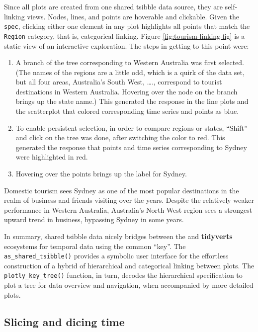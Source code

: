Since all plots are created from one shared tsibble data source, they
are self-linking views. Nodes, lines, and points are hoverable and
clickable. Given the \texttt{spec}, clicking either one element in any
plot highlights all points that match the \texttt{Region} category, that
is, categorical linking. Figure \ref{fig:tourism-linking-fig} is a
static view of an interactive exploration. The steps in getting to this
point were:

\begin{enumerate}
\def\labelenumi{\arabic{enumi}.}
\tightlist
\item
  A branch of the tree corresponding to Western Australia was first
  selected. (The names of the regions are a little odd, which is a quirk
  of the data set, but all four areas, Australia's South West, \ldots.,
  correspond to tourist destinations in Western Australia. Hovering over
  the node on the branch brings up the state name.) This generated the
  response in the line plots and the scatterplot that colored
  corresponding time series and points as blue.
\item
  To enable persistent selection, in order to compare regions or states,
  ``Shift'' and click on the tree was done, after switching the color to
  red. This generated the response that points and time series
  corresponding to Sydney were highlighted in red.
\item
  Hovering over the points brings up the label for Sydney.
\end{enumerate}

Domestic tourism sees Sydney as one of the most popular destinations in
the realm of business and friends visiting over the years. Despite the
relatively weaker performance in Western Australia, Australia's North
West region sees a strongest upward trend in business, bypassing Sydney
in some years.

In summary, shared tsibble data nicely bridges between the
 and \textbf{tidyverts} ecosystems for temporal data
using the common ``key''. The \texttt{as\_shared\_tsibble()} provides a
symbolic user interface for the effortless construction of a hybrid of
hierarchical and categorical linking between plots. The
\texttt{plotly\_key\_tree()} function, in turn, decodes the hierarchical
specification to plot a tree for data overview and navigation, when
accompanied by more detailed plots.

\hypertarget{slicing-and-dicing-time}{%
\subsection{Slicing and dicing time}\label{slicing-and-dicing-time}}

